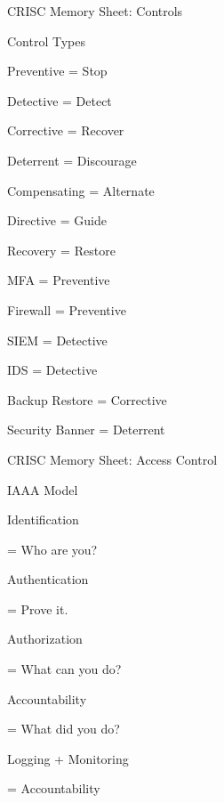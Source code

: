\documentclass{beamer}
\begin{document}
	\begin{frame}[shrink=10]{CRISC Memory Sheet: Controls}
		\begin{block}{Control Types}
			
			Preventive = Stop
			
			Detective = Detect
			
			Corrective = Recover
			
			Deterrent = Discourage
			
			Compensating = Alternate
			
			Directive = Guide
			
			Recovery = Restore
			
			\vspace{0.15cm}
			
			MFA = Preventive
			
			Firewall = Preventive
			
			SIEM = Detective
			
			IDS = Detective
			
			Backup Restore = Corrective
			
			Security Banner = Deterrent
			
		\end{block}
	\end{frame}
	
	\begin{frame}[shrink=10]{CRISC Memory Sheet: Access Control}
		\begin{block}{IAAA Model}
			
			Identification
			
			= Who are you?
			
			\vspace{0.1cm}
			
			Authentication
			
			= Prove it.
			
			\vspace{0.1cm}
			
			Authorization
			
			= What can you do?
			
			\vspace{0.1cm}
			
			Accountability
			
			= What did you do?
			
			\vspace{0.15cm}
			
			Logging + Monitoring
			
			= Accountability
			
		\end{block}
	\end{frame}
	
\end{document}
